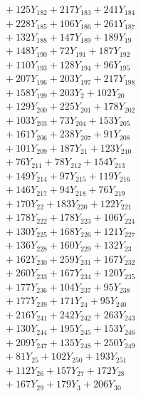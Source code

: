 \documentclass[a4paper,10pt]{article}
\begin{document}
{\begin{align}
&\quad  + 125Y_{182} + 217Y_{183} + 241Y_{184} \\[0.5ex]
&\quad  + 228Y_{185} + 106Y_{186} + 261Y_{187} \\[0.5ex]
&\quad  + 132Y_{188} + 147Y_{189} + 189Y_{19} \\[0.5ex]
&\quad  + 148Y_{190} + 72Y_{191} + 187Y_{192} \\[0.5ex]
&\quad  + 110Y_{193} + 128Y_{194} + 96Y_{195} \\[0.5ex]
&\quad  + 207Y_{196} + 203Y_{197} + 217Y_{198} \\[0.5ex]
&\quad  + 158Y_{199} + 203Y_{2} + 102Y_{20} \\[0.5ex]
&\quad  + 129Y_{200} + 225Y_{201} + 178Y_{202} \\[0.5ex]
&\quad  + 103Y_{203} + 73Y_{204} + 153Y_{205} \\[0.5ex]
&\quad  + 161Y_{206} + 238Y_{207} + 91Y_{208} \\[0.5ex]
&\quad  + 101Y_{209} + 187Y_{21} + 123Y_{210} \\[0.5ex]
&\quad  + 76Y_{211} + 78Y_{212} + 154Y_{213} \\[0.5ex]
&\quad  + 149Y_{214} + 97Y_{215} + 119Y_{216} \\[0.5ex]
&\quad  + 146Y_{217} + 94Y_{218} + 76Y_{219} \\[0.5ex]
&\quad  + 170Y_{22} + 183Y_{220} + 122Y_{221} \\[0.5ex]
&\quad  + 178Y_{222} + 178Y_{223} + 106Y_{224} \\[0.5ex]
&\quad  + 130Y_{225} + 168Y_{226} + 121Y_{227} \\[0.5ex]
&\quad  + 136Y_{228} + 160Y_{229} + 132Y_{23} \\[0.5ex]
&\quad  + 162Y_{230} + 259Y_{231} + 167Y_{232} \\[0.5ex]
&\quad  + 260Y_{233} + 167Y_{234} + 120Y_{235} \\[0.5ex]
&\quad  + 177Y_{236} + 104Y_{237} + 95Y_{238} \\[0.5ex]
&\quad  + 177Y_{239} + 171Y_{24} + 95Y_{240} \\[0.5ex]
&\quad  + 216Y_{241} + 242Y_{242} + 263Y_{243} \\[0.5ex]
&\quad  + 130Y_{244} + 195Y_{245} + 153Y_{246} \\[0.5ex]
&\quad  + 209Y_{247} + 135Y_{248} + 250Y_{249} \\[0.5ex]
&\quad  + 81Y_{25} + 102Y_{250} + 193Y_{251} \\[0.5ex]
&\quad  + 112Y_{26} + 157Y_{27} + 172Y_{28} \\[0.5ex]
&\quad  + 167Y_{29} + 179Y_{3} + 206Y_{30} \\[0.5ex]

\end{align}}
\end{document}

